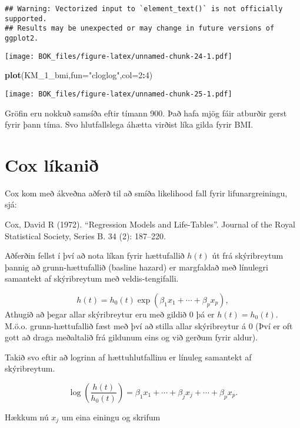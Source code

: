 \documentclass[
]{book}
\newenvironment{Shaded}{\begin{snugshade}}{\end{snugshade}}
\newcommand{\DataTypeTok}[1]{\textcolor[rgb]{0.13,0.29,0.53}{#1}}
\newcommand{\DecValTok}[1]{\textcolor[rgb]{0.00,0.00,0.81}{#1}}
\newcommand{\KeywordTok}[1]{\textcolor[rgb]{0.13,0.29,0.53}{\textbf{#1}}}
\newcommand{\NormalTok}[1]{#1}
\newcommand{\OperatorTok}[1]{\textcolor[rgb]{0.81,0.36,0.00}{\textbf{#1}}}
\newcommand{\StringTok}[1]{\textcolor[rgb]{0.31,0.60,0.02}{#1}}
\begin{document}
\begin{verbatim}
## Warning: Vectorized input to `element_text()` is not officially supported.
## Results may be unexpected or may change in future versions of ggplot2.
\end{verbatim}

\texttt{[image: BOK\_files/figure-latex/unnamed-chunk-24-1.pdf]}

\begin{Shaded}
\begin{Highlighting}[]
\KeywordTok{plot}\NormalTok{(KM\_}\DecValTok{1}\NormalTok{\_bmi,}\DataTypeTok{fun=}\StringTok{"cloglog"}\NormalTok{,}\DataTypeTok{col=}\DecValTok{2}\OperatorTok{:}\DecValTok{4}\NormalTok{)}
\end{Highlighting}
\end{Shaded}

\texttt{[image: BOK\_files/figure-latex/unnamed-chunk-25-1.pdf]}

Gröfin eru nokkuð samsíða eftir tímann 900. Það hafa mjög fáir atburðir gerst fyrir þann tíma. Svo hlutfallslega áhætta virðist líka gilda fyrir BMI.

\hypertarget{cox}{%
\section{Cox líkanið}\label{cox}}

Cox kom með ákveðna aðferð til að smíða likelihood fall fyrir lifunargreiningu, sjá:

Cox, David R (1972). ``Regression Models and Life-Tables''. Journal of the Royal Statistical Society, Series B. 34 (2): 187--220.

Aðferðin fellst í því að nota líkan fyrir hættufallið \(h(t)\) út frá skýribreytum þannig að grunn-hættufallið (basline hazard) er margfaldað með línulegri samantekt af skýribreytum með veldis-tengifalli.

\[
h(t) = h_0(t) \exp(\beta_1 x_1 + \cdots + \beta_p x_p),
\]
Athugið að þegar allar skýribreytur eru með gildið 0 þá er \(h(t) = h_0(t)\). M.ö.o. grunn-hættufallið fæst með því að stilla allar skýribreytur á 0 (Því er oft gott að draga meðaltalið frá gildunum eins og við gerðum fyrir aldur).

Takið svo eftir að logrinn af hættuhlutfallinu er línuleg samantekt af skýribreytum.

\[
\log \left( \frac{h(t)}{h_0(t)} \right) = \beta_1 x_1 + \cdots + \beta_j x_j + \cdots + \beta_p x_p.
\]

Hækkum nú \(x_j\) um eina einingu og skrifum
\end{document}
